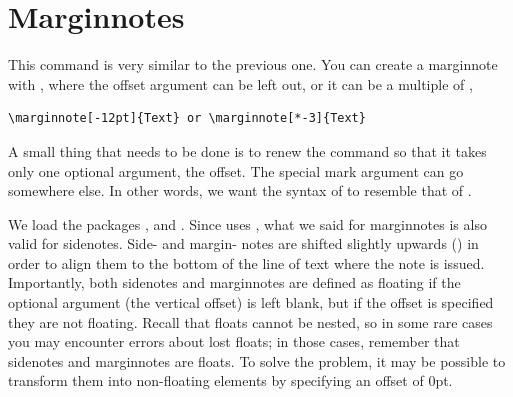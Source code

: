 \section{Marginnotes}

This command is very similar to the previous one. You can create a 
marginnote with , where the offset 
argument can be left out, or it can be a multiple of 
, 
\eg

\begin{lstlisting}[style=kaolstplain]
\marginnote[-12pt]{Text} or \marginnote[*-3]{Text}
\end{lstlisting}

\begin{kaobox}[frametitle=To Do]
A small thing that needs to be done is to renew the  
command so that it takes only one optional argument, the offset. The 
special mark argument can go somewhere else. In other words, we want the 
syntax of  to resemble that of .
\end{kaobox}

We load the packages ,  and 
. Since  uses , 
what we said for marginnotes is also valid for sidenotes. Side- and 
margin- notes are shifted slightly upwards 
() in 
order to align them to the bottom of the line of text where the note is 
issued. Importantly, both sidenotes and marginnotes are defined as 
floating if the optional argument (\ie the vertical offset) is left 
blank, but if the offset is specified they are not floating. Recall that 
floats cannot be nested, so in some rare cases you may encounter errors 
about lost floats; in those cases, remember that sidenotes and 
marginnotes are floats. To solve the problem, it may be possible to 
transform them into non-floating elements by specifying an offset of 
0pt.

